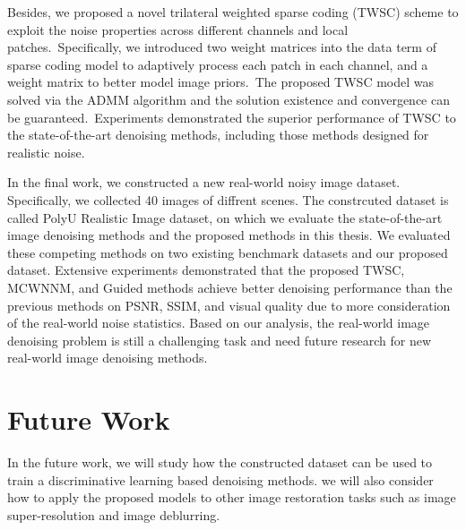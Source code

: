 Besides, we proposed a novel trilateral weighted sparse coding (TWSC) scheme to exploit the noise properties across different channels and local patches.\ Specifically, we introduced two weight matrices into the data term of sparse coding model to adaptively process each patch in each channel, and a weight matrix to better model image priors.\ The proposed TWSC model was solved via the ADMM algorithm and the solution existence and convergence can be guaranteed.\ Experiments demonstrated the superior performance of TWSC to the state-of-the-art denoising methods, including those methods designed for realistic noise.

In the final work, we constructed a new real-world noisy image dataset. Specifically, we collected 40 images of diffrent scenes. The constrcuted dataset is called PolyU Realistic Image dataset, on which we evaluate the state-of-the-art image denoising methods and the proposed methods in this thesis. We evaluated these competing methods on two existing benchmark datasets and our proposed dataset. Extensive experiments demonstrated that the proposed TWSC, MCWNNM, and Guided methods achieve better denoising performance than the previous methods on PSNR, SSIM, and visual quality due to more consideration of the real-world noise statistics. Based on our analysis, the real-world image denoising problem is still a challenging task and need future research for new real-world image denoising methods.



\section{Future Work}
\label{sec:conclusions:future}

In the future work, we will study how the constructed dataset can be used to train a discriminative learning based denoising methods. we will also consider how to apply the proposed models to other image restoration tasks such as image super-resolution and image deblurring.
